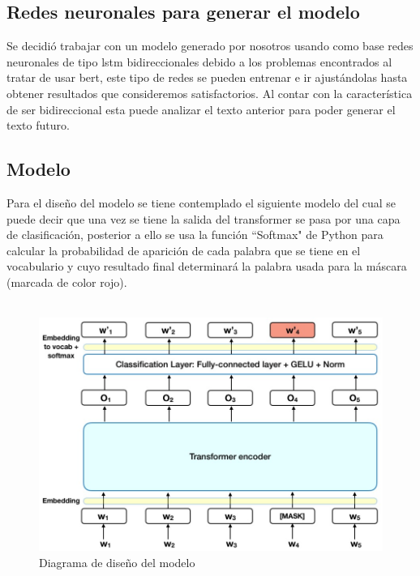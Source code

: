 \documentclass[12pt, a4paper, titlepage]{report}
\begin{document}
		\subsection{Redes neuronales para generar el modelo} %
		Se decidió trabajar con un modelo generado por nosotros usando como base redes neuronales de tipo \acrshort{lstm} bidireccionales debido a los problemas encontrados al tratar de usar \acrshort{bert}, este tipo de redes se pueden entrenar e ir ajustándolas hasta obtener resultados que consideremos satisfactorios. Al contar con la característica de ser bidireccional esta puede analizar el texto anterior para poder generar el texto futuro.
		
		\subsection{Modelo} %
		
		Para el diseño del modelo se tiene contemplado el siguiente modelo del cual se puede decir que una vez se tiene la salida del transformer se pasa por una capa de clasificación, posterior a ello se usa la función “Softmax" de Python para calcular la probabilidad de aparición de cada palabra que se tiene en el vocabulario y cuyo resultado final determinará la palabra usada para la máscara (marcada de color rojo).
		\\\\

		
		\begin{figure}[H]
			\includegraphics[width=12cm]{./imagenes/Disenio/Iteracion_3/bert_preoutput_model.jpg}
			\centering 
			\caption{Diagrama de diseño del modelo}
		\end{figure}
		
\end{document}
